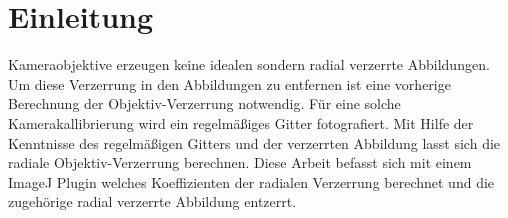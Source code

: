 \section{Einleitung}\label{sec:Introduction}



Kameraobjektive erzeugen keine idealen sondern radial verzerrte Abbildungen. Um diese Verzerrung in den Abbildungen zu entfernen ist eine vorherige Berechnung der Objektiv-Verzerrung notwendig. Für eine solche Kamerakallibrierung wird ein regelmäßiges Gitter fotografiert. Mit Hilfe der Kenntnisse des regelmäßigen Gitters und der verzerrten Abbildung lasst sich die radiale Objektiv-Verzerrung berechnen. Diese Arbeit befasst sich mit einem ImageJ Plugin welches Koeffizienten der radialen Verzerrung berechnet und die zugehörige radial verzerrte Abbildung entzerrt.






















